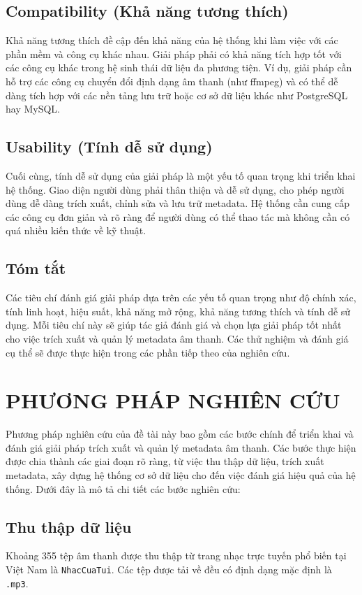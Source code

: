 \documentclass[conference]{IEEEtran}
\begin{document}
\subsection{Compatibility (Khả năng tương thích)}
Khả năng tương thích đề cập đến khả năng của hệ thống khi làm việc với các phần mềm và công cụ khác nhau. Giải pháp phải có khả năng tích hợp tốt với các công cụ khác trong hệ sinh thái dữ liệu đa phương tiện. Ví dụ, giải pháp cần hỗ trợ các công cụ chuyển đổi định dạng âm thanh (như ffmpeg) và có thể dễ dàng tích hợp với các nền tảng lưu trữ hoặc cơ sở dữ liệu khác như PostgreSQL hay MySQL.

\subsection{Usability (Tính dễ sử dụng)}
Cuối cùng, tính dễ sử dụng của giải pháp là một yếu tố quan trọng khi triển khai hệ thống. Giao diện người dùng phải thân thiện và dễ sử dụng, cho phép người dùng dễ dàng trích xuất, chỉnh sửa và lưu trữ metadata. Hệ thống cần cung cấp các công cụ đơn giản và rõ ràng để người dùng có thể thao tác mà không cần có quá nhiều kiến thức về kỹ thuật.

\subsection{Tóm tắt}
Các tiêu chí đánh giá giải pháp dựa trên các yếu tố quan trọng như độ chính xác, tính linh hoạt, hiệu suất, khả năng mở rộng, khả năng tương thích và tính dễ sử dụng. Mỗi tiêu chí này sẽ giúp tác giả đánh giá và chọn lựa giải pháp tốt nhất cho việc trích xuất và quản lý metadata âm thanh. Các thử nghiệm và đánh giá cụ thể sẽ được thực hiện trong các phần tiếp theo của nghiên cứu.



\section{PHƯƠNG PHÁP NGHIÊN CỨU}

Phương pháp nghiên cứu của đề tài này bao gồm các bước chính để triển khai và đánh giá giải pháp trích xuất và quản lý metadata âm thanh. Các bước thực hiện được chia thành các giai đoạn rõ ràng, từ việc thu thập dữ liệu, trích xuất metadata, xây dựng hệ thống cơ sở dữ liệu cho đến việc đánh giá hiệu quả của hệ thống. Dưới đây là mô tả chi tiết các bước nghiên cứu:

\subsection{Thu thập dữ liệu}
Khoảng 355 tệp âm thanh được thu thập từ trang nhạc trực tuyến phổ biến tại Việt Nam
 là \texttt{NhacCuaTui}. Các tệp được tải về đều có định dạng mặc định là \texttt{.mp3}.
\end{document}
